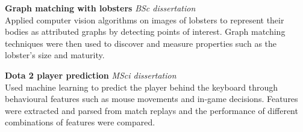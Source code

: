 \documentclass{article}
\newcommand{\n}[0]{\\[\baselineskip]}
\begin{document}



\textbf{Graph matching with lobsters} \textit{BSc dissertation} \\
Applied computer vision algorithms on images of lobsters to represent their bodies as
attributed graphs by detecting points of interest. Graph matching techniques were then
used to discover and measure properties such as the lobster's size and maturity.

\textbf{Dota 2 player prediction} \textit{MSci dissertation} \\
Used machine learning to predict the player behind the keyboard through behavioural features such as mouse movements and in-game decisions. Features were extracted and parsed from match replays and the performance of different combinations of features were compared.


% 
% 
\end{document}
